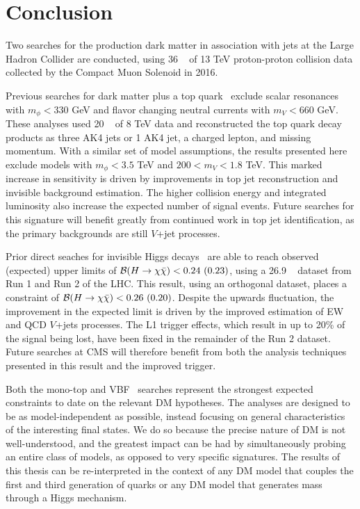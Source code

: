 \chapter{Conclusion}

Two searches for the production dark matter in association with jets at the Large Hadron Collider are conducted, using 36 \fbinv~ of 13 TeV proton-proton collision data collected by the Compact Muon Solenoid in 2016.

Previous searches for dark matter plus a top quark~\cite{cms8mt,atlas8mt} exclude scalar resonances with $m_\phi<330$ GeV and flavor changing neutral currents with $m_V<660$ GeV.
These analyses used 20 \fbinv~ of 8 TeV data and reconstructed the top quark decay products as three AK4 jets or 1 AK4 jet, a charged lepton, and missing momentum.
With a similar set of model assumptions, the results presented here exclude models with $m_\phi < 3.5$ TeV and $200<m_V<1.8$ TeV.
This marked increase in sensitivity is driven by improvements in top jet reconstruction and invisible background estimation.
The higher collision energy and integrated luminosity also increase the expected number of signal events. 
Future searches for this signature will benefit greatly from continued work in top jet identification, as the primary backgrounds are still $V$+jet processes.

Prior direct seaches for invisible Higgs decays~\cite{cmshinvrun1} are able to reach observed (expected) upper limits of $\mathcal{B}(H\rightarrow\chi\bar\chi) < 0.24~(0.23)$, using a 26.9 \fbinv~ dataset from Run 1 and Run 2 of the LHC.
This result, using an orthogonal dataset, places a constraint of $\mathcal{B}(H\rightarrow\chi\bar\chi) < 0.26~(0.20)$.
Despite the upwards fluctuation, the improvement in the expected limit is driven by the improved estimation of EW and QCD $V$+jets processes.
The L1 trigger effects, which result in up to 20\% of the signal being lost, have been fixed in the remainder of the Run 2 dataset.
Future searches at CMS will therefore benefit from both the analysis techniques presented in this result and the improved trigger.

Both the mono-top and VBF \hinv~searches represent the strongest expected constraints to date on the relevant DM hypotheses.
The analyses are designed to be as model-independent as possible, instead focusing on general characteristics of the interesting final states. 
We do so because the precise nature of DM is not well-understood, and the greatest impact can be had by simultaneously probing an entire class of models, as opposed to very specific signatures.
The results of this thesis can be re-interpreted in the context of any DM model that couples the first and third generation of quarks or any DM model that generates mass through a Higgs mechanism. 

